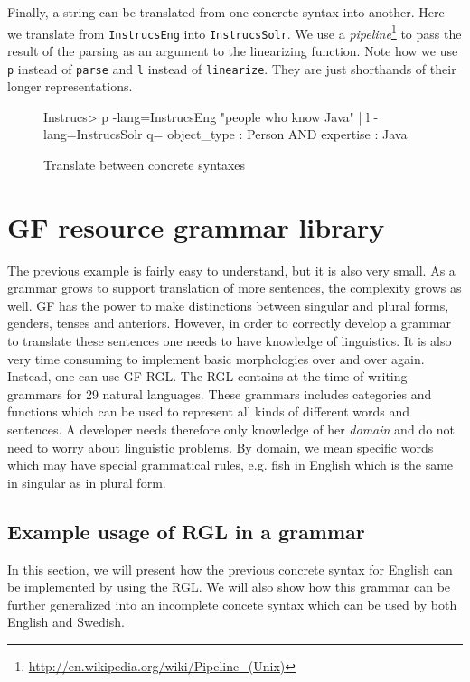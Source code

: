 Finally, a string can be translated from one concrete syntax into another. Here we translate from \texttt{InstrucsEng} into \texttt{InstrucsSolr}. We use a \emph{pipeline}\footnote{\url{http://en.wikipedia.org/wiki/Pipeline_(Unix)}} to pass the result of the parsing as an argument to the linearizing function. Note how we use \texttt{p} instead of \texttt{parse} and \texttt{l} instead of \texttt{linearize}. They are just shorthands of their longer representations.

\begin{figure}[H]
\begin{terminal}
Instrucs> p -lang=InstrucsEng "people who know Java" | l -lang=InstrucsSolr
q= object_type : Person AND expertise : Java
\end{terminal}
\caption{Translate between concrete syntaxes\label{fig:translation-concr}}
\end{figure}


\section{GF resource grammar library}

The previous example is fairly easy to understand, but it is also very small. As a grammar grows to support translation of more sentences, the complexity grows as well. GF has the power to make distinctions between singular and plural forms, genders, tenses and anteriors. However, in order to correctly develop a grammar to translate these sentences one needs to have knowledge of linguistics. It is also very time consuming to implement basic morphologies over and over again. Instead, one can use GF \ac{RGL}. The RGL contains at the time of writing grammars for 29 natural languages. These grammars includes categories and functions which can be used to represent all kinds of different words and sentences. A developer needs therefore only knowledge of her \emph{domain} and do not need to worry about linguistic problems. By domain, we mean specific words which may have special grammatical rules, e.g. fish in English which is the same in singular as in plural form.

\subsection{Example usage of RGL in a grammar}

In this section, we will present how the previous concrete syntax for English can be implemented by using the \ac{RGL}. We will also show how this grammar can be further generalized into an incomplete concete syntax which can be used by both English and Swedish.

